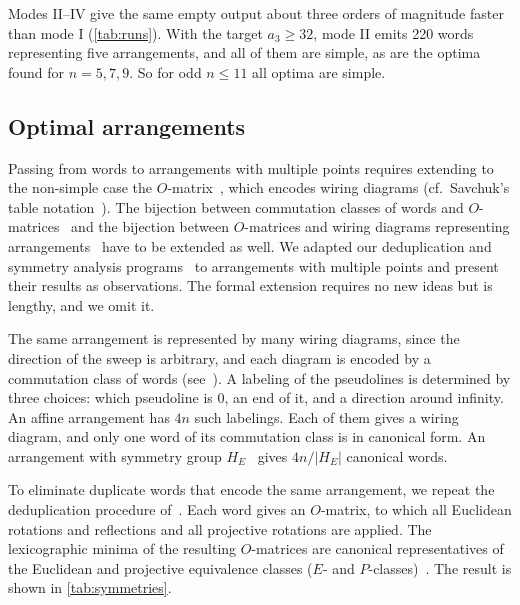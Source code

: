 Modes II--IV give the same empty output about three orders of magnitude faster than mode I (\cref{tab:runs}).
With the target $a_3\ge32$, mode II emits 220 words representing five arrangements, and all of them are simple, as are the optima found for $n=5,7,9$. So for odd $n\le11$ all optima are simple.

\subsection{Optimal arrangements}

Passing from words to arrangements with multiple points requires extending to the non-simple case the $O$-matrix~\cite[Definition~5.1]{pu26b}, which encodes wiring diagrams (cf.~Savchuk's table notation~\cite{savchuk25}).
The bijection between commutation classes of words and $O$-matrices~\cite[Lemma~5.2]{pu26b} and the bijection between $O$-matrices and wiring diagrams representing arrangements~\cite[Remark~5.3]{pu26b} have to be extended as well.
We adapted our deduplication and symmetry analysis programs~\cite[Section~5]{pu26b} to arrangements with multiple points and present their results as observations.
The formal extension requires no new ideas but is lengthy, and we omit it.

The same arrangement is represented by many wiring diagrams, since the direction of the sweep is arbitrary, and each diagram is encoded by a commutation class of words (see~\cite[Observation~2.1]{pu26b}).
A labeling of the pseudolines is determined by three choices: which pseudoline is $0$, an end of it, and a direction around infinity.
An affine arrangement has $4n$ such labelings.
Each of them gives a wiring diagram, and only one word of its commutation class is in canonical form.
An arrangement with symmetry group $H_E$~\cite[Definition~5.11]{pu26b} gives $4n/|H_E|$ canonical words.

To eliminate duplicate words that encode the same arrangement, we repeat the deduplication procedure of~\cite[Subsection~7.2]{pu26b}.
Each word gives an $O$-matrix, to which all Euclidean rotations and reflections and all projective rotations are applied.
The lexicographic minima of the resulting $O$-matrices are canonical representatives of the Euclidean and projective equivalence classes ($E$- and $P$-classes)~\cite[Definitions~5.7 and~5.8]{pu26b}. The result is shown in \cref{tab:symmetries}.

